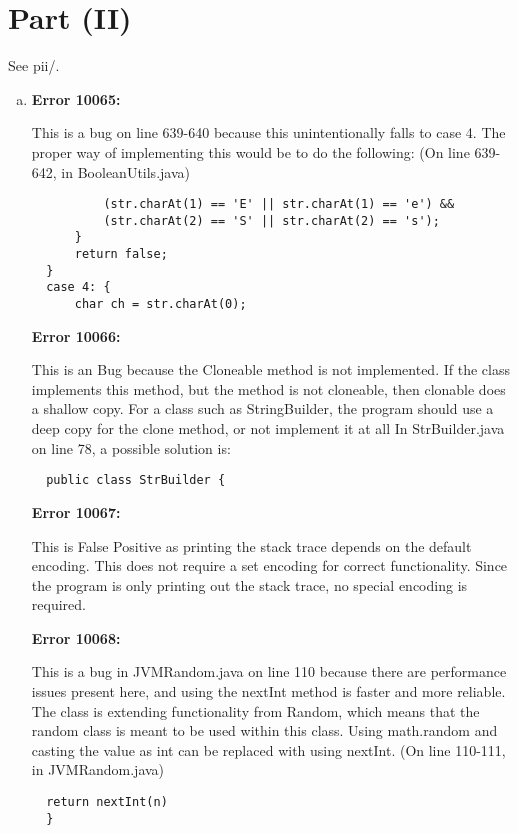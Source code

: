 \documentclass{article}
\begin{document}
  \section*{Part (II)}
  See pii/.
  \begin{enumerate}[(a)]
  \item
  \textbf{Error 10065:}

  This is a bug on line 639-640 because this unintentionally falls to case 4.  The proper way of implementing this would be to do the following: (On line 639-642, in BooleanUtils.java)

  \begin{lstlisting}
          (str.charAt(1) == 'E' || str.charAt(1) == 'e') &&
          (str.charAt(2) == 'S' || str.charAt(2) == 's');
      }
      return false;
  }
  case 4: {
      char ch = str.charAt(0);
  \end{lstlisting}

  \textbf{Error 10066:}

  This is an Bug because the Cloneable method is not implemented. If the class implements this method, but the method is not cloneable, then clonable does a shallow copy. For a class such as StringBuilder, the program should use a deep copy for the clone method, or not implement it at all In StrBuilder.java on line 78, a possible solution is:

  \begin{lstlisting}
  public class StrBuilder {
  \end{lstlisting}

  \textbf{Error 10067:}

  This is False Positive as printing the stack trace depends on the default encoding. This does not require a set encoding for correct functionality. Since the program is only printing out the stack trace, no special encoding is required.

  \textbf{Error 10068:}

  This is a bug in JVMRandom.java on line 110 because there are performance issues present here, and using the nextInt method is faster and more reliable. The class is extending functionality from Random, which means that the random class is meant to be used  within this class. Using math.random and casting the value as int can be replaced with using nextInt. (On line 110-111, in JVMRandom.java)

  \begin{lstlisting}
  return nextInt(n)
  }
  \end{lstlisting}


\end{enumerate}
\end{document}
